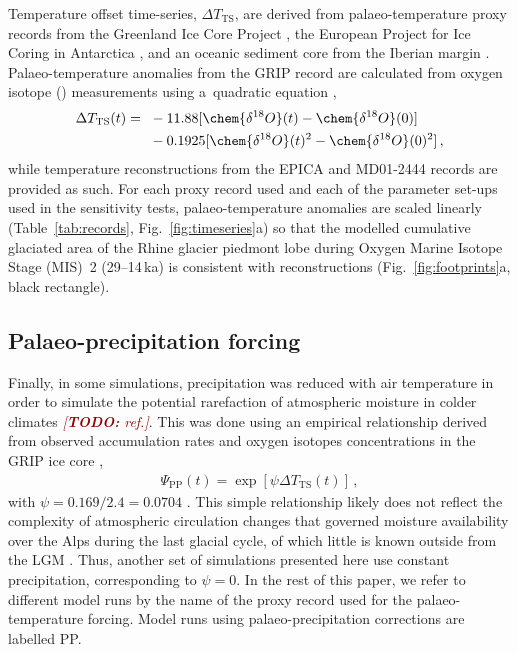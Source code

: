 \documentclass[tc, manuscript]{copernicus}
\newcommand{\todo}[1]{\textcolor{darkred}{\emph{[\textbf{TODO:} #1]}}}
\begin{document}
    Temperature offset time-series, ${\Delta}T_{\text{TS}}$, are derived from
    palaeo-temperature proxy records from the Greenland Ice Core Project
    \citep[GRIP;][]{Dansgaard.etal.1993}, the European Project for Ice Coring
    in Antarctica \citep[EPICA;][] {Jouzel.etal.2007}, and an oceanic sediment
    core from the Iberian margin \citep[MD01-2444;][]{Martrat.etal.2007}.
    Palaeo-temperature anomalies from the GRIP record are calculated from
    oxygen isotope () measurements using a~quadratic
    equation \citep{Johnsen.etal.1995},
    \begin{align}
      {\Delta}T_{\text{TS}}(t) ={~}&-11.88 [\chem{\delta^{18}O}(t)
                                    -\chem{\delta^{18}O}(0)] \nonumber \\
                                   &-0.1925 [\chem{\delta^{18}O}(t)^2
                                    -\chem{\delta^{18}O}(0)^2] \,,
    \end{align}
    while temperature reconstructions from the EPICA and MD01-2444 records are
    provided as such. For each proxy record used and each of the parameter
    set-ups used in the sensitivity tests, palaeo-temperature anomalies are
    scaled linearly (Table~\ref{tab:records}, Fig.~\ref{fig:timeseries}a) so
    that the modelled cumulative glaciated area of the Rhine glacier piedmont
    lobe during Oxygen Marine Isotope Stage (MIS)~2 (29--14\,ka) is consistent
    with reconstructions (Fig.~\ref{fig:footprints}a, black rectangle).


\subsection{Palaeo-precipitation forcing}
\label{sec:palprec}

    Finally, in some simulations, precipitation was reduced with air temperature in
    order to simulate the potential rarefaction of atmospheric moisture in
    colder climates \todo{ref.}. This was done using an empirical relationship derived from
    observed accumulation rates and oxygen isotopes concentrations in the GRIP
    ice core \citep{Dahl-Jensen.etal.1993},
    \begin{align}
      {\Psi}_{\text{PP}}(t) = \exp[\psi{\Delta}T_{\text{TS}}(t)] \,,
    \end{align}
    with $\psi=0.169/2.4=0.0704$ \citep{Huybrechts.2002}. This simple
    relationship likely does not reflect the complexity of atmospheric
    circulation changes that governed moisture availability over the Alps
    during the last glacial cycle, of which little is known outside from the
    LGM \citep[cf.][]{Wu.etal.2007, Strandberg.etal.2011, Ludwig.etal.2016}.
    Thus, another set of simulations presented here use constant
    precipitation, corresponding to $\psi=0$. In the rest of this paper, we
    refer to different model runs by the name of the proxy record used for the
    palaeo-temperature forcing. Model runs using palaeo-precipitation
    corrections are labelled PP.
\end{document}
